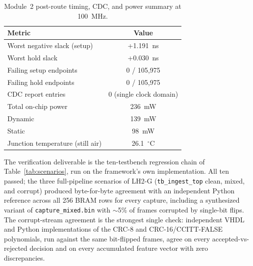 \documentclass[conference]{IEEEtran}
\begin{document}
\begin{table}[t]
\centering
\caption{Module~2 post-route timing, CDC, and power summary at 100~MHz.}
\label{tab:mod2timing}
\begin{tabular}{l c}
\toprule
\textbf{Metric} & \textbf{Value} \\
\midrule
Worst negative slack (setup)            & +1.191~ns \\
Worst hold slack                        & +0.030~ns \\
Failing setup endpoints                 & 0 / 105{,}975 \\
Failing hold endpoints                  & 0 / 105{,}975 \\
CDC report entries                      & 0 (single clock domain) \\
Total on-chip power                     & 236~mW \\
\hspace{1em}Dynamic                     & 139~mW \\
\hspace{1em}Static                      & 98~mW \\
Junction temperature (still air)        & 26.1~$^\circ$C \\
\bottomrule
\end{tabular}
\end{table}

The verification deliverable is the ten-testbench regression chain of Table~\ref{tab:scenarios}, run on the framework's own implementation. All ten passed; the three full-pipeline scenarios of LH2-G (\texttt{tb\_ingest\_top} clean, mixed, and corrupt) produced byte-for-byte agreement with an independent Python reference across all 256 BRAM rows for every capture, including a synthesized variant of \texttt{capture\_mixed.bin} with $\sim$5\% of frames corrupted by single-bit flips. The corrupt-stream agreement is the strongest single check: independent VHDL and Python implementations of the CRC-8 and CRC-16/CCITT-FALSE polynomials, run against the same bit-flipped frames, agree on every accepted-vs-rejected decision and on every accumulated feature vector with zero discrepancies.
\end{document}
